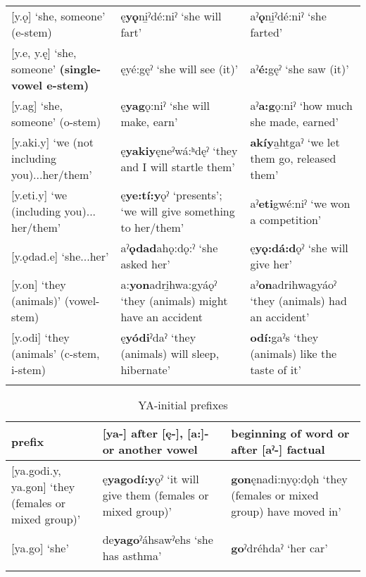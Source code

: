 \begin{table}
{\begin{tabularx}{\textwidth}{XXX}
\scriptsize{[y.ǫ] ‘she, someone’ (e-stem)} & \scriptsize{ę\textbf{yǫ}ni̱ˀdé:niˀ ‘she will fart’} & \scriptsize{aˀ\textbf{ǫ}ni̱ˀdé:niˀ ‘she farted’}\\
\scriptsize{[y.e, y.ę] ‘she, someone’ \textbf{(single-vowel e-stem)}} & \scriptsize{ęyé:gęˀ ‘she will see (it)’} & \scriptsize{aˀ\textbf{é:}gęˀ ‘she saw (it)’}\\
\scriptsize{[y.ag] ‘she, someone’ (o-stem)} & \scriptsize{ę\textbf{yag}ǫ:niˀ ‘she will make, earn’} & \scriptsize{aˀ\textbf{a:g}ǫ:niˀ ‘how much she made, earned’}\\
\scriptsize{[y.aki.y] ‘we (not including you)...her/them’} & \scriptsize{ę\textbf{yakiy}ęneˀwá:ʰdęˀ ‘they and I will startle them’} & \scriptsize{\textbf{akíy}a̱htgaˀ ‘we let them go, released them’}\\
\scriptsize{[y.eti.y] ‘we (including you)... her/them’} & \scriptsize{ę\textbf{ye:tí:y}ǫˀ ‘presents’; ‘we will give something to her/them’} & \scriptsize{aˀ\textbf{eti}gwé:niˀ ‘we won a competition’}\\
\scriptsize{[y.ǫdad.e] ‘she...her’} & \scriptsize{aˀ\textbf{ǫdad}ahǫ:dǫ:ˀ ‘she asked her’} & \scriptsize{ę\textbf{yǫ:dá:d}ǫˀ ‘she will give her’}\\
\scriptsize{[y.on] ‘they (animals)’ (vowel-stem)} & \scriptsize{a:\textbf{yon}adri̱hwa:gyáǫˀ ‘they (animals) might have an accident} & \scriptsize{aˀ\textbf{on}adrihwagyáoˀ ‘they (animals) had an accident’}\\
\scriptsize{[y.odi] ‘they (animals’ (c-stem, i-stem)} & \scriptsize{ę\textbf{yódi}ˀdaˀ ‘they (animals) will sleep, hibernate}’ & \scriptsize{\textbf{odí:}gaˀs ‘they (animals) like the taste of it’}\\
\lspbottomrule
\end{tabularx}}
\end{table}



\begin{table}
\caption{YA-initial prefixes}
\label{tab:1:yainit}
\scriptsize{
\begin{tabularx}{\textwidth}{XXX}

\lsptoprule
prefix & [ya-] after [ę-], [a:]- or another vowel & beginning of word or after [aˀ-] factual \\
\midrule
{}[ya.godi.y, ya.gon] ‘they (females or mixed group)’ & ę\textbf{yagodí:y}ǫˀ ‘it will give them (females or mixed group)’ & \textbf{gon}ęnadi:nyǫ:dǫh ‘they (females or mixed group) have moved in’\\
{}[ya.go] ‘she’ & de\textbf{yago}ˀáhsawˀehs ‘she has asthma’ & \textbf{go}ˀdréhdaˀ ‘her car’\\
\lspbottomrule
\end{tabularx}}
\end{table}


